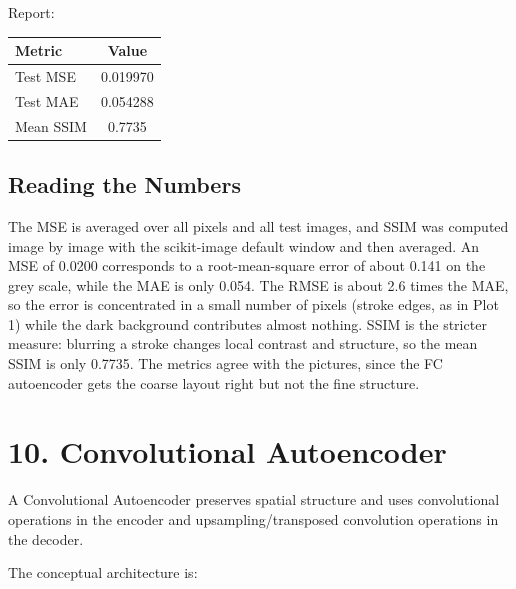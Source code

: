 \documentclass[10pt]{article}
\begin{document}
Report:

\begin{center}
\begin{tabular}{|l|c|}
\hline
Metric & Value\\
\hline
Test MSE & 0.019970\\
Test MAE & 0.054288\\
Mean SSIM & 0.7735\\
\hline
\end{tabular}
\end{center}

\subsection*{Reading the Numbers}

The MSE is averaged over all pixels and all test images, and SSIM was computed
image by image with the scikit-image default window and then averaged. An MSE of
0.0200 corresponds to a root-mean-square error of about 0.141 on the grey scale,
while the MAE is only 0.054. The RMSE is about 2.6 times the MAE, so the error is
concentrated in a small number of pixels (stroke edges, as in Plot 1) while the
dark background contributes almost nothing. SSIM is the stricter measure: blurring
a stroke changes local contrast and structure, so the mean SSIM is only 0.7735.
The metrics agree with the pictures, since the FC autoencoder gets the coarse
layout right but not the fine structure.

\section*{10. Convolutional Autoencoder}

A Convolutional Autoencoder preserves spatial structure and uses convolutional
operations in the encoder and upsampling/transposed convolution operations
in the decoder.

The conceptual architecture is:

\begin{center}
\end{center}
\end{document}
